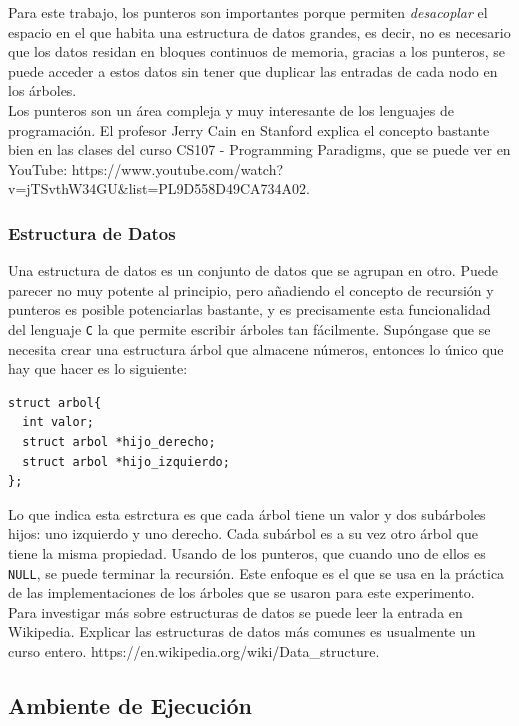 \documentclass[12pt,letterpaper]{report}
\begin{document}
Para este trabajo, los punteros son importantes porque permiten \emph{desacoplar} el espacio en el que habita una estructura de datos grandes, es decir, no es necesario que los datos residan en bloques continuos de memoria, gracias a los punteros, se puede acceder a estos datos sin tener que duplicar las entradas de cada nodo en los árboles.\\

Los punteros son un área compleja y muy interesante de los lenguajes de programación. El profesor Jerry Cain en Stanford explica el concepto bastante bien en las clases del curso CS107 - Programming Paradigms, que se puede ver en YouTube: https://www.youtube.com/watch?v=jTSvthW34GU\&list=PL9D558D49CA734A02.

\subsubsection{Estructura de Datos}
Una estructura de datos es un conjunto de datos que se agrupan en otro. Puede parecer no muy potente al principio, pero añadiendo el concepto de recursión y punteros es posible potenciarlas bastante, y es precisamente esta funcionalidad del lenguaje \texttt{C} la que permite escribir árboles tan fácilmente. Supóngase que se necesita crear una estructura árbol que almacene números, entonces lo único que hay que hacer es lo siguiente:
\begin{verbatim}
struct arbol{
  int valor;
  struct arbol *hijo_derecho;
  struct arbol *hijo_izquierdo;
};
\end{verbatim}
Lo que indica esta estrctura es que cada árbol tiene un valor y dos subárboles hijos: uno izquierdo y uno derecho. Cada subárbol es a su vez otro árbol que tiene la misma propiedad. Usando de los punteros, que cuando uno de ellos es \texttt{NULL}, se puede terminar la recursión. Este enfoque es el que se usa en la práctica de las implementaciones de los árboles que se usaron para este experimento.\\

Para investigar más sobre estructuras de datos se puede leer la entrada en Wikipedia. Explicar las estructuras de datos más comunes es usualmente un curso entero. https://en.wikipedia.org/wiki/Data\_structure.

\subsection{Ambiente de Ejecución}
\label{subsec:ambiente}
\end{document}

